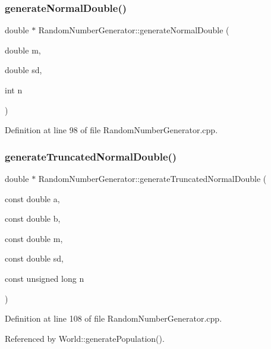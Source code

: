 \mbox{\label{class_random_number_generator_a77c562dbcc80b5e69941a0a3609af316}} 
\subsubsection{generate\+Normal\+Double()\hspace{0.1cm}{\footnotesize\ttfamily [2/2]}}
{\footnotesize\ttfamily double $\ast$ Random\+Number\+Generator\+::generate\+Normal\+Double (\begin{DoxyParamCaption}\item[{double}]{m,  }\item[{double}]{sd,  }\item[{int}]{n }\end{DoxyParamCaption})}



Definition at line 98 of file Random\+Number\+Generator.\+cpp.

\mbox{\label{class_random_number_generator_ac7870b30aa51e740b06cbead31e7b080}} 
\subsubsection{generate\+Truncated\+Normal\+Double()}
{\footnotesize\ttfamily double $\ast$ Random\+Number\+Generator\+::generate\+Truncated\+Normal\+Double (\begin{DoxyParamCaption}\item[{const double}]{a,  }\item[{const double}]{b,  }\item[{const double}]{m,  }\item[{const double}]{sd,  }\item[{const unsigned long}]{n }\end{DoxyParamCaption})}



Definition at line 108 of file Random\+Number\+Generator.\+cpp.



Referenced by World\+::generate\+Population().

